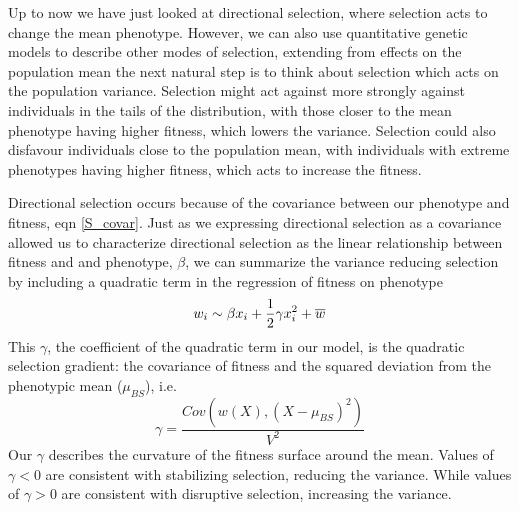 Up to now we have just looked at directional selection, where
selection acts to change the mean phenotype. However, we
can also use quantitative genetic models to describe other modes of
selection, extending from effects on the population mean the next
natural step is to think about selection which acts on the
population variance. Selection might act against more strongly against
individuals in the tails of the distribution, with those closer
to the mean phenotype having higher fitness, which lowers the
variance. Selection could also disfavour individuals close to the
population mean, with individuals with extreme phenotypes having
higher fitness, which acts to increase the fitness. 

Directional selection occurs because of the covariance
between our phenotype and fitness, eqn \eqref{S_covar}. Just as we expressing directional selection as a covariance allowed us to
characterize directional selection as the linear relationship between
fitness and and phenotype, $\beta$, we can summarize the variance
reducing selection by including a quadratic term in the regression of
fitness on phenotype
\begin{equation}
w_i \sim \beta x_i + \frac{1}{2}  \gamma x_i^2  + \overline{w} \label{fitness_regression_stab}
\end{equation}
This $\gamma$, the coefficient of the quadratic term in our model, is the
quadratic selection gradient: the covariance of fitness and the squared
deviation from the phenotypic mean ($\mu_{BS}$), i.e.
\begin{equation}
\gamma = \frac{Cov\left(w(X), (X-\mu_{BS})^2 \right)}{V^2}
\end{equation}
Our $\gamma$ describes the curvature of the fitness surface around the
mean. 
Values of $\gamma<0$  are consistent with stabilizing selection,
reducing the variance. While values of $\gamma>0$ are consistent with disruptive
selection, increasing the variance. 


